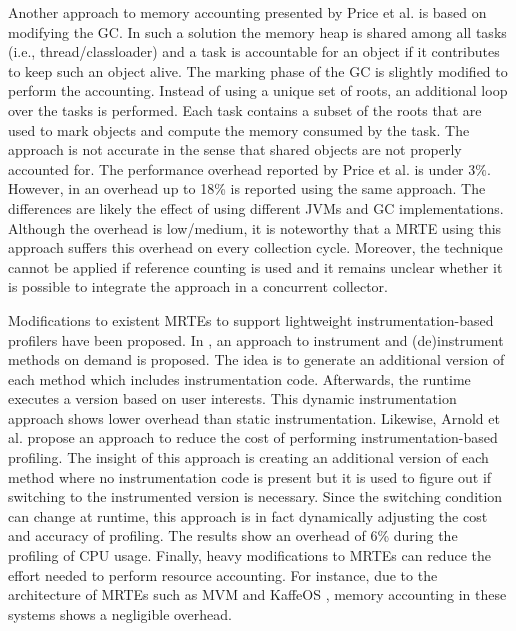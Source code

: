 Another approach to memory accounting presented by Price et al. \cite{Price:2003:GCM:829515.830545} is based on modifying the GC.
In such a solution the memory heap is shared among all tasks (i.e., thread/classloader) and a task is accountable for an object if it contributes to keep such an object alive.
The marking phase of the GC is slightly modified to perform the accounting.
Instead of using a unique set of roots, an additional loop over the tasks is performed.
Each task contains a subset of the roots that are used to mark objects and compute the memory consumed by the task.
The approach is not accurate in the sense that shared objects are not properly accounted for.
The performance overhead reported by Price et al. \cite{Price:2003:GCM:829515.830545} is under 3$\%$.
However, in \cite{dsn/09/geoffray/ijvm} an overhead up to 18\% is reported using the same approach.
The differences are likely the effect of using different JVMs and GC implementations.
Although the overhead is low/medium, it is noteworthy that a MRTE using this approach suffers this overhead on every collection cycle.
Moreover, the technique cannot be applied if reference counting is used and it remains unclear whether it is possible to integrate the approach in a concurrent collector.

Modifications to existent MRTEs to support lightweight instrumentation-based profilers have been proposed.
In \cite{Dmitriev:2004:PJA:974043.974067}, an approach to instrument and (de)instrument methods on demand is proposed.
The idea is to generate an additional version of each method which includes instrumentation code.
Afterwards, the runtime executes a version based on user interests.
This dynamic instrumentation approach shows lower overhead than static instrumentation.
Likewise, Arnold et al. \cite{citeulike:481405} propose an approach to reduce the cost of performing instrumentation-based profiling.
The insight of this approach is creating an additional version of each method where no instrumentation code is present but it is used to figure out if switching to the instrumented version is necessary.
Since the switching condition can change at runtime, this approach is in fact dynamically adjusting the cost and accuracy of profiling.
The results show an overhead of 6\% during the profiling of CPU usage.
Finally, heavy modifications to MRTEs can reduce the effort needed to perform resource accounting.
For instance, due to the architecture of MRTEs such as MVM \cite{czajkowski_multitasking_2001} and KaffeOS \cite{back_processes_2000}, memory accounting in these systems shows a negligible overhead.

